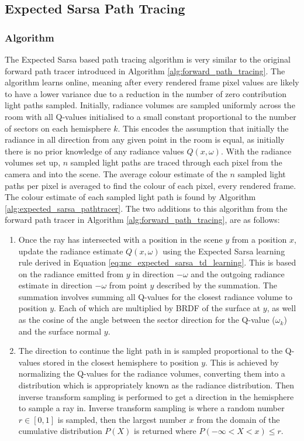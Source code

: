 \documentclass[../dissertation.tex]{subfiles}
\begin{document}
\subsection{Expected Sarsa Path Tracing}

\subsubsection{Algorithm}
The Expected Sarsa based path tracing algorithm is very similar to the original forward path tracer introduced in Algorithm \ref{alg:forward_path_tracing}. The algorithm learns online, meaning after every rendered frame pixel values are likely to have a lower variance due to a reduction in the number of zero contribution light paths sampled. Initially, radiance volumes are sampled uniformly across the room with all Q-values initialised to a small constant proportional to the number of sectors on each hemisphere $k$. This encodes the assumption that initially the radiance in all direction from any given point in the room is equal, as initially there is no prior knowledge of any radiance values $Q(x, \omega)$. With the radiance volumes set up, $n$ sampled light paths are traced through each pixel from the camera and into the scene. The average colour estimate of the $n$ sampled light paths per pixel is averaged to find the colour of each pixel, every rendered frame. The colour estimate of each sampled light path is found by Algorithm \ref{alg:expected_sarsa_pathtracer}. The two additions to this algorithm from the forward path tracer in Algorithm \ref{alg:forward_path_tracing}, are as follows:

\begin{enumerate}
\item Once the ray has intersected with a position in the scene $y$ from a position $x$, update the radiance estimate $Q(x, \omega)$ using the Expected Sarsa learning rule derived in Equation \ref{eq:mc_expected_sarsa_td_learning}. This is based on the radiance emitted from $y$ in direction $-\omega$ and the outgoing radiance estimate in direction $-\omega$ from point $y$ described by the summation. The summation involves summing all Q-values for the closest radiance volume to position $y$. Each of which are multiplied by BRDF of the surface at $y$, as well as the cosine of the angle between the sector direction for the Q-value ($\omega_k$) and the surface normal $y$.

\item The direction to continue the light path in is sampled proportional to the Q-values stored in the closest hemisphere to position $y$. This is achieved by normalizing the Q-values for the radiance volumes, converting them into a distribution which is appropriately known as the radiance distribution. Then inverse transform sampling \cite{devroye2006nonuniform} is performed to get a direction in the hemisphere to sample a ray in. Inverse transform sampling is where a random number $r \in [0,1]$ is sampled, then the largest number $x$ from the domain of the cumulative distribution $P(X)$ is returned where $ P(-\infty < X < x) \leq r$. 
\end{enumerate}
\end{document}

